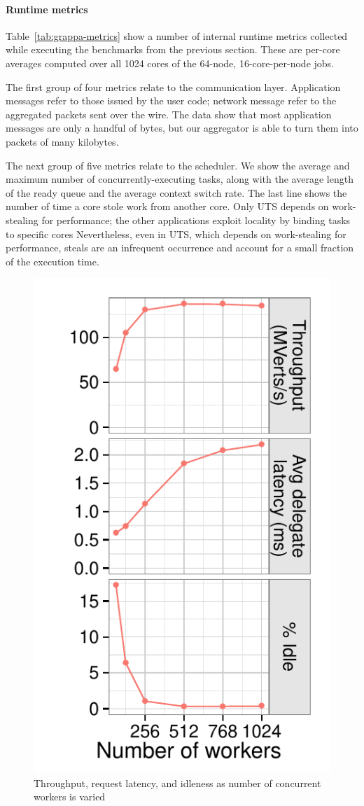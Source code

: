 \paragraph{Runtime metrics}
Table~\ref{tab:grappa-metrics} show a number of internal runtime
metrics collected while executing the benchmarks from the previous
section. These are per-core averages computed over all 1024 cores of
the 64-node, 16-core-per-node jobs.

The first group of four metrics relate to the communication
layer. Application messages refer to those issued by the user code;
network message refer to the aggregated packets sent over the wire. The
data show that most application messages are only a handful of bytes,
but our aggregator is able to turn them into packets of many kilobytes.

The next group of five metrics relate to the scheduler. We show the
average and maximum number of concurrently-executing tasks, along with
the average length of the ready queue and the average context switch
rate.  The last line shows the number of time a core stole work from
another core. Only UTS depends on work-stealing for performance; the
other applications exploit locality by binding tasks to specific cores
Nevertheless, even in UTS, which depends on work-stealing for
performance, steals are an infrequent occurrence and account for a
small fraction of the execution time.



\begin{figure}[ht]
    \begin{center}
      \includegraphics[height=0.5\textwidth, angle=90]{results/plot_concurrency.pdf}
    \end{center}
    \vspace*{-0.25in}
    \caption{Throughput, request latency, and idleness as number of concurrent workers is varied}
    \label{fig:grappa-concurrency}
\end{figure}

